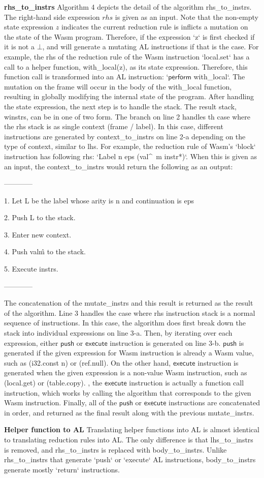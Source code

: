 \textbf{rhs\_to\_instrs} Algorithm 4 depicts the detail of the algorithm rhs\_to\_instrs.
The right-hand side expression $rhs$ is given as an input.
Note that the non-empty state expression $z$ indicates the current reduction rule is
inflicts a mutation on the state of the Wasm program. Therefore, if the expression `z`
is first checked if it is not a $\bot$, and will generate a mutating AL instructions if
that is the case. For example, the rhs of the reduction rule of the Wasm instruction
`local.set` has a call to a helper function, with\_local(z), as its state expression.
Therefore, this function call is transformed into an AL instruction: `$\mathsf{perform}$ with\_local`.
The mutation on the frame will occur in the body of the with\_local function, resulting in globally
modifying the internal state of the program. After handling the state expression, the next step is to
handle the stack. The result stack, winstrs, can be in one of two form. The branch on
line 2 handles th case where the rhs stack is as single context (frame / label). In this case,
different instructions are generated by context\_to\_instrs on line 2-a depending on the type of context,
similar to lhs. For example, the reduction rule of Wasm's `block` instruction has following rhs:
`Label n eps (val\^~m instr*)`. When this is given as an input, the context\_to\_instrs would return the
following as an output:

------------

1. Let L be the label whose arity is n and continuation is eps

2. Push L to the stack.

3. Enter new context.

4. Push val\^m to the stack.

5. Execute instrs.

------------

The concatenation of the mutate\_instrs and this result is returned as the result of the algorithm.
Line 3 handles the case where rhs instruction stack is a normal sequence of instructions. In this case,
the algorithm does first break down the stack into individual expressions on line 3-a. Then,
by iterating over each expression, either $\mathsf{push}$ or $\mathsf{execute}$ instruction is
generated on line 3-b. $\mathsf{push}$ is generated if the given expression for Wasm instruction is
already a Wasm value, such as (i32.const n) or (ref.null). On the other hand, $\mathsf{execute}$ instruction is generated
when the given expression is a non-value Wasm instruction, such as (local.get) or (table.copy).
, the $\mathsf{execute}$ instruction is actually a function call instruction,
which works by calling the algorithm that corresponds to the given Wasm instruction.
Finally, all of the $\mathsf{push}$ or $\mathsf{execute}$ instructions are concatenated in order, and
returned as the final result along with the previous mutate\_instrs.

\textbf{Helper function to AL} Translating helper functions into
AL is almost identical to translating reduction rules into AL. The only difference is that lhs\_to\_instrs
is removed, and rhs\_to\_instrs is replaced with body\_to\_instrs. Unlike
rhs\_to\_instrs that generate `push` or `execute` AL instructions, body\_to\_instrs generate mostly
`return` instructions.
